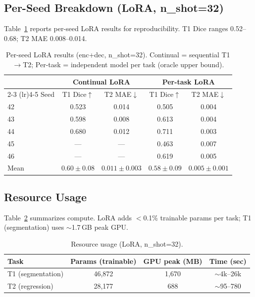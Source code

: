 \documentclass[journal,twoside,web]{ieeecolor}
\begin{document}
\subsection{Per-Seed Breakdown (LoRA, n\_shot=32)}
\label{sec:per_seed}

Table~\ref{tab:per_seed} reports per-seed LoRA results for reproducibility. T1 Dice ranges 0.52--0.68; T2 MAE 0.008--0.014.

\begin{table}[h!]
\caption{Per-seed LoRA results (enc+dec, n\_shot=32). Continual = sequential T1$\to$T2; Per-task = independent model per task (oracle upper bound).}
\label{tab:per_seed}
\centering
\begin{tabular}{lcccc}
\toprule
 & \multicolumn{2}{c}{Continual LoRA} & \multicolumn{2}{c}{Per-task LoRA} \\
\cmidrule(lr){2-3} \cmidrule(lr){4-5}
Seed & T1 Dice$\uparrow$ & T2 MAE$\downarrow$ & T1 Dice$\uparrow$ & T2 MAE$\downarrow$ \\
\midrule
42 & 0.523 & 0.014 & 0.505 & 0.004 \\
43 & 0.598 & 0.008 & 0.613 & 0.004 \\
44 & 0.680 & 0.012 & 0.711 & 0.003 \\
45 & --- & --- & 0.463 & 0.007 \\
46 & --- & --- & 0.619 & 0.005 \\
\midrule
Mean & $0.60 \pm 0.08$ & $0.011 \pm 0.003$ & $0.58 \pm 0.09$ & $0.005 \pm 0.001$ \\
\bottomrule
\end{tabular}
\end{table}

\subsection{Resource Usage}
\label{sec:resource}

Table~\ref{tab:resource} summarizes compute. LoRA adds $<$0.1\% trainable params per task; T1 (segmentation) uses $\sim$1.7\,GB peak GPU.

\begin{table}[h!]
\caption{Resource usage (LoRA, n\_shot=32).}
\label{tab:resource}
\centering
\begin{tabular}{lccc}
\toprule
Task & Params (trainable) & GPU peak (MB) & Time (sec) \\
\midrule
T1 (segmentation) & 46,872 & 1,670 & $\sim$4k--26k \\
T2 (regression) & 28,177 & 688 & $\sim$95--780 \\
\bottomrule
\end{tabular}
\end{table}
\end{document}
